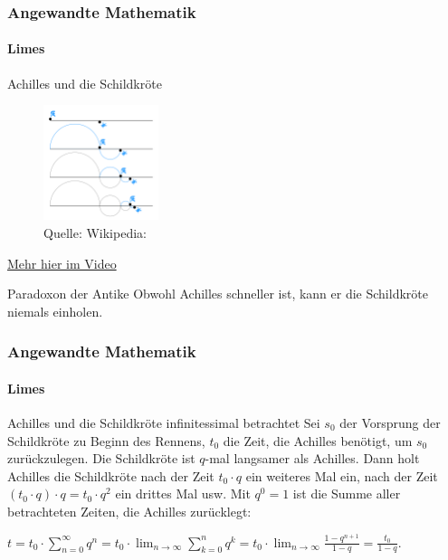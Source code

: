 \documentclass{beamer}
\begin{document}
\begin{frame}
    \frametitle{Angewandte Mathematik}
\framesubtitle{Limes}
    \begin{block}{Achilles und die Schildkröte}
\begin{figure}[H]
      \centering
    \includegraphics[width=0.3\textwidth]{images/Zeno_Achilles_Paradox}
      \caption{Quelle: Wikipedia: }
\end{figure}
\href{https://www.youtube.com/watch?v=X8Qksx_Ng9k}{Mehr hier im Video}
\end{block}
  \begin{block}{Paradoxon der Antike}
 Obwohl Achilles schneller ist, kann er die Schildkröte niemals einholen.
\end{block}
 \end{frame}


\begin{frame}
    \frametitle{Angewandte Mathematik}
\framesubtitle{Limes}
    \begin{block}{Achilles und die Schildkröte infinitessimal betrachtet}
Sei $s_0$ der Vorsprung der Schildkröte zu Beginn des Rennens, $t_0$ die Zeit, die Achilles benötigt, um $s_0$ zurückzulegen. Die Schildkröte ist $q$-mal langsamer als Achilles.
Dann holt Achilles die Schildkröte nach der Zeit $t_0 \cdot q$ ein weiteres Mal ein, nach der Zeit $(t_0 \cdot q) \cdot q = t_0 \cdot q^2$ ein drittes Mal usw.
Mit $q^0 = 1$ ist die Summe aller betrachteten Zeiten, die Achilles zurücklegt:

$t = t_0 \cdot \sum_{n=0}^\infty q^n = t_0 \cdot \lim_{n \to \infty} \sum_{k=0}^{n} q^{k} = t_0 \cdot \lim_{n \to \infty} \frac{1 - q^{n+1}}{1 -q} = \frac{t_0}{1 -q}$.
\end{block}
 \end{frame}
\end{document}
